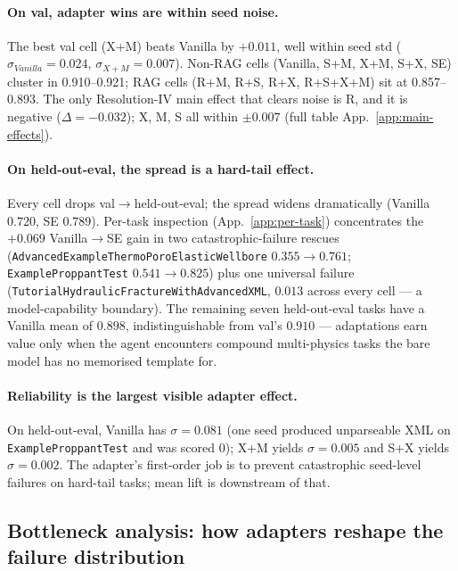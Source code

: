 \documentclass{article}
\begin{document}
\paragraph{On val, adapter wins are within seed noise.} The best val cell (X+M) beats Vanilla by $+0.011$, well within seed std ($\sigma_{Vanilla}=0.024$, $\sigma_{X+M}=0.007$). Non-RAG cells (Vanilla, S+M, X+M, S+X, SE) cluster in 0.910--0.921; RAG cells (R+M, R+S, R+X, R+S+X+M) sit at 0.857--0.893. The only Resolution-IV main effect that clears noise is R, and it is negative ($\Delta = -0.032$); X, M, S all within $\pm 0.007$ (full table App.~\ref{app:main-effects}).

\paragraph{On held-out-eval, the spread is a hard-tail effect.}\label{subsec:per-task} Every cell drops val$\to$held-out-eval; the spread widens dramatically (Vanilla $0.720$, SE $0.789$). Per-task inspection (App.~\ref{app:per-task}) concentrates the $+0.069$ Vanilla$\to$SE gain in two catastrophic-failure rescues (\texttt{AdvancedExampleThermoPoroElasticWellbore} $0.355 \to 0.761$; \texttt{ExampleProppantTest} $0.541 \to 0.825$) plus one universal failure (\texttt{TutorialHydraulicFractureWithAdvancedXML}, $0.013$ across every cell --- a model-capability boundary). The remaining seven held-out-eval tasks have a Vanilla mean of $0.898$, indistinguishable from val's $0.910$ — adaptations earn value only when the agent encounters compound multi-physics tasks the bare model has no memorised template for.

\paragraph{Reliability is the largest visible adapter effect.} On held-out-eval, Vanilla has $\sigma=0.081$ (one seed produced unparseable XML on \texttt{ExampleProppantTest} and was scored 0); X+M yields $\sigma=0.005$ and S+X yields $\sigma=0.002$. The adapter's first-order job is to prevent catastrophic seed-level failures on hard-tail tasks; mean lift is downstream of that.

\subsection{Bottleneck analysis: how adapters reshape the failure distribution}
\label{subsec:bottleneck-results}
\end{document}
